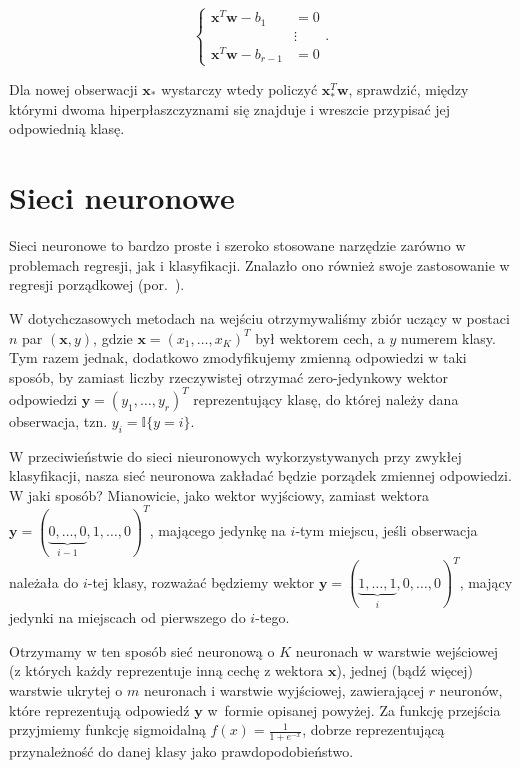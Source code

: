\documentclass{mini}
\begin{document}
$$\begin{cases}
\textbf{x}^T\textbf{w}-b_1 &=0\\
&\vdots \\
\textbf{x}^T\textbf{w}-b_{r-1} &=0
\end{cases}.
$$

Dla nowej obserwacji $\textbf{x}_\ast$ wystarczy wtedy policzyć $\textbf{x}_\ast^T\textbf{w}$, sprawdzić, między którymi dwoma hiperpłaszczyznami się znajduje i wreszcie przypisać jej odpowiednią klasę.

\section{Sieci neuronowe}
 
Sieci neuronowe to bardzo proste i szeroko stosowane narzędzie zarówno w problemach regresji, jak i klasyfikacji. Znalazło ono również swoje zastosowanie w regresji porządkowej (por.~\cite{nna}). 

W dotychczasowych metodach na wejściu otrzymywaliśmy zbiór uczący w postaci $n$ par $(\textbf{x},y)$, gdzie $\textbf{x} = (x_1, \ldots, x_K)^T$ był wektorem cech, a $y$ numerem klasy. Tym razem jednak, dodatkowo zmodyfikujemy zmienną odpowiedzi w taki sposób, by zamiast liczby rzeczywistej otrzymać zero-jedynkowy wektor odpowiedzi $\textbf{y} = (y_1, \ldots, y_r)^T$ reprezentujący klasę, do której należy dana obserwacja, tzn. $y_i = \mathbb{I}\lbrace y =i \rbrace$.

W przeciwieństwie do sieci nieuronowych wykorzystywanych przy zwykłej klasyfikacji, nasza sieć neuronowa zakładać będzie porządek zmiennej odpowiedzi. W jaki sposób? Mianowicie, jako wektor wyjściowy, zamiast wektora $\textbf{y} = (\underbrace{0, \ldots, 0}_{i-1}, 1, \ldots, 0)^T$, mającego jedynkę na $i$-tym miejscu, jeśli obserwacja należała do $i$-tej klasy, rozważać będziemy wektor $\textbf{y} = (\underbrace{1, \ldots, 1}_{i}, 0, \ldots, 0)^T$, mający jedynki na miejscach od pierwszego do $i$-tego.

Otrzymamy w ten sposób sieć neuronową o $K$ neuronach w warstwie wejściowej (z których każdy reprezentuje inną cechę z wektora $\textbf{x}$), jednej (bądź więcej) warstwie ukrytej o $m$ neuronach i warstwie wyjściowej, zawierającej $r$ neuronów, które reprezentują odpowiedź $\textbf{y}$ w~formie opisanej powyżej. Za funkcję przejścia przyjmiemy funkcję sigmoidalną $f(x) = \frac{1}{1+e^{-x}}$, dobrze reprezentującą przynależność do danej klasy jako prawdopodobieństwo. 
\end{document}
